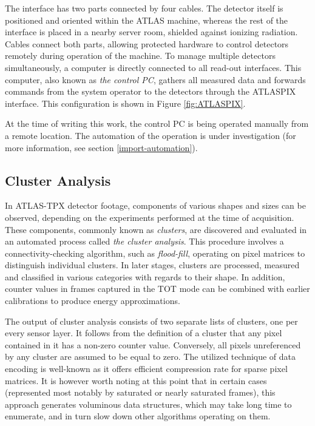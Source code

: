 
The interface has two parts connected by four cables. The detector itself is positioned and oriented within the ATLAS machine, whereas the rest of the interface is placed in a nearby server room, shielded against ionizing radiation. Cables connect both parts, allowing protected hardware to control detectors remotely during operation of the machine. To manage multiple detectors simultaneously, a computer is directly connected to all read-out interfaces. This computer, also known as \textit{the control PC}, gathers all measured data and forwards commands from the system operator to the detectors through the ATLASPIX interface. This configuration is shown in Figure \ref{fig:ATLASPIX}.

At the time of writing this work, the control PC is being operated manually from a remote location. The automation of the operation is under investigation (for more information, see section \ref{import-automation}).

\subsection{Cluster Analysis}
\label{intro:cluster-analysis}
In ATLAS-TPX detector footage, components of various shapes and sizes can be observed, depending on the experiments performed at the time of acquisition. These components, commonly known as \textit{clusters}, are discovered and evaluated in an automated process called \textit{the cluster analysis}. This procedure involves a connectivity-checking algorithm, such as \textit{flood-fill}, operating on pixel matrices to distinguish individual clusters. In later stages, clusters are processed, measured and classified in various categories with regards to their shape. In addition, counter values in frames captured in the TOT mode can be combined with earlier calibrations to produce energy approximations. \cite{Jakubek2011S262}


The output of cluster analysis consists of two separate lists of clusters, one per every sensor layer. It follows from the definition of a cluster that any pixel contained in it has a non-zero counter value. Conversely, all pixels unreferenced by any cluster are assumed to be equal to zero. The utilized technique of data encoding is well-known as it offers efficient compression rate for sparse pixel matrices. It is however worth noting at this point that in certain cases (represented most notably by saturated or nearly saturated frames), this approach generates voluminous data structures, which may take long time to enumerate, and in turn slow down other algorithms operating on them.

